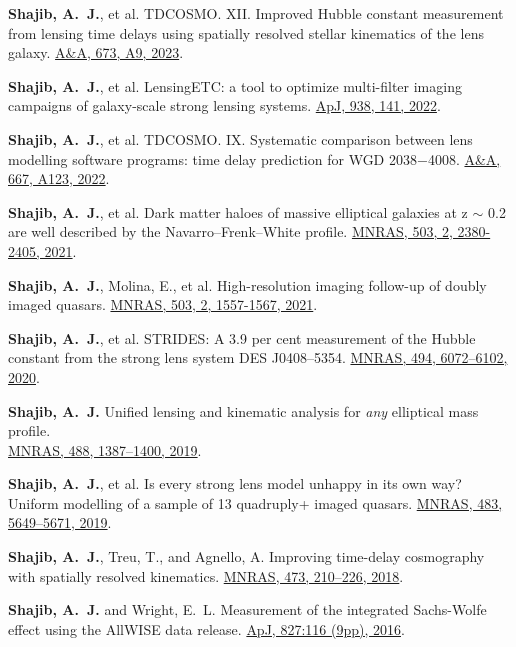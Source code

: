 \documentclass[margin, line]{res}
\begin{document}
\begin{resume}
\begin{etaremune}
	\item \textbf{Shajib, A.~J.}, et al. TDCOSMO. XII. Improved Hubble constant measurement from lensing time delays using spatially resolved stellar kinematics of the lens galaxy. \href{https://ui.adsabs.harvard.edu/abs/2023A\%26A...673A...9S/abstract}{A\&A, 673, A9, 2023}.
	\item \textbf{Shajib, A.~J.}, et al. LensingETC: a tool to optimize multi-filter imaging campaigns of galaxy-scale strong lensing systems. \href{https://doi.org/10.3847/1538-4357/ac927b}{ApJ, 938, 141, 2022}.
	\item \textbf{Shajib, A.~J.}, et al. TDCOSMO. IX. Systematic comparison between lens modelling software programs: time delay prediction for WGD 2038$-$4008. \href{https://ui.adsabs.harvard.edu/abs/2022A\%26A...667A.123S/abstract}{A\&A, 667, A123, 2022}.
	\item \textbf{Shajib, A.~J.}, et al. Dark matter haloes of massive elliptical galaxies at z $\sim$ 0.2 are well described by the Navarro--Frenk--White profile. \href{https://doi.org/10.1093/mnras/stab536}{MNRAS, 503, 2, 2380-2405, 2021}.
	\item \textbf{Shajib, A.~J.}, Molina, E.{\mentee}, et al. High-resolution imaging follow-up of doubly imaged quasars. \href{https://doi:10.1093/mnras/stab532}{MNRAS, 503, 2, 1557-1567, 2021}.
	\item \textbf{Shajib, A.~J.}, et al. STRIDES: A 3.9 per cent measurement of the Hubble constant from the strong lens system DES J0408--5354. \href{https://academic.oup.com/mnras/advance-article-abstract/doi/10.1093/mnras/staa828/5813265}{MNRAS, 494, 6072--6102, 2020}.
	\item \textbf{Shajib, A.~J.} Unified lensing and kinematic analysis for \textit{any} elliptical mass profile. \\ \href{https://doi.org/10.1093/mnras/stz1796}{MNRAS, 488, 1387--1400, 2019}.
	\item \textbf{Shajib, A.~J.}, et al. Is every strong lens model unhappy in its own way? Uniform modelling of a sample of 13 quadruply+ imaged quasars. \href{https://doi.org/10.1093/mnras/sty3397}{MNRAS, 483, 5649--5671, 2019}.
	\item \textbf{Shajib, A.~J.}, Treu, T., and Agnello, A. Improving time-delay cosmography with spatially resolved kinematics. \href{https://doi.org/10.1093/mnras/stx2302}{MNRAS, 473, 210--226, 2018}.
	\item \textbf{Shajib, A.~J.} and Wright, E.~L. Measurement of the integrated Sachs-Wolfe effect using the AllWISE data release. \href{http://dx.doi.org/10.3847/0004-637X/827/2/116}{ApJ, 827:116 (9pp), 2016}.
\end{etaremune}



\end{resume}
\end{document}
